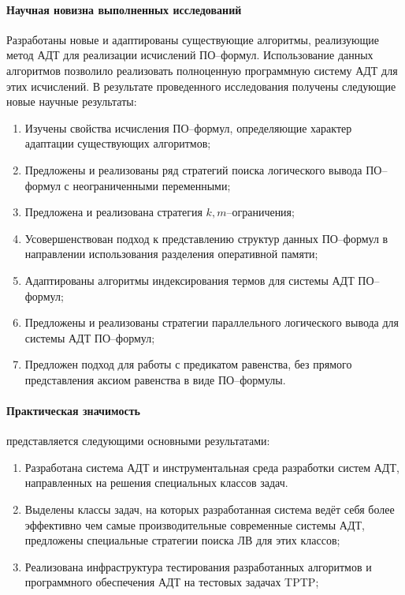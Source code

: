 \paragraph{Научная новизна выполненных исследований}
Разработаны новые и адаптированы существующие алгоритмы, реализующие метод АДТ для реализации исчислений ПО--формул. Использование данных алгоритмов позволило реализовать полноценную программную систему АДТ для этих исчислений. В результате проведенного исследования получены следующие новые научные результаты:
\begin{enumerate}
\item Изучены свойства исчисления ПО--формул, определяющие характер адаптации существующих алгоритмов;
\item Предложены и реализованы ряд стратегий поиска логического вывода ПО--формул с неограниченными переменными;
\item Предложена и реализована стратегия $k,m$--ограничения;
\item Усовершенствован подход к представлению структур данных ПО--формул в направлении использования разделения оперативной памяти;
\item Адаптированы алгоритмы индексирования термов для системы АДТ ПО--формул;
\item Предложены и реализованы стратегии параллельного логического вывода для системы АДТ ПО--формул;
\item Предложен подход для работы с предикатом равенства, без прямого представления аксиом равенства в виде ПО--формулы.
\end{enumerate}

\paragraph{Практическая значимость}\hspace{-1em} представляется следующими основными результатами:
\begin{enumerate}
\item Разработана система АДТ и инструментальная среда разработки систем АДТ, направленных на решения специальных классов задач.
\item Выделены классы задач, на которых разработанная система ведёт себя более эффективно чем самые производительные современные системы АДТ, предложены специальные стратегии поиска ЛВ для этих классов;
\item Реализована инфраструктура тестирования разработанных алгоритмов и программного обеспечения АДТ на тестовых задачах TPTP; %
\end{enumerate}

